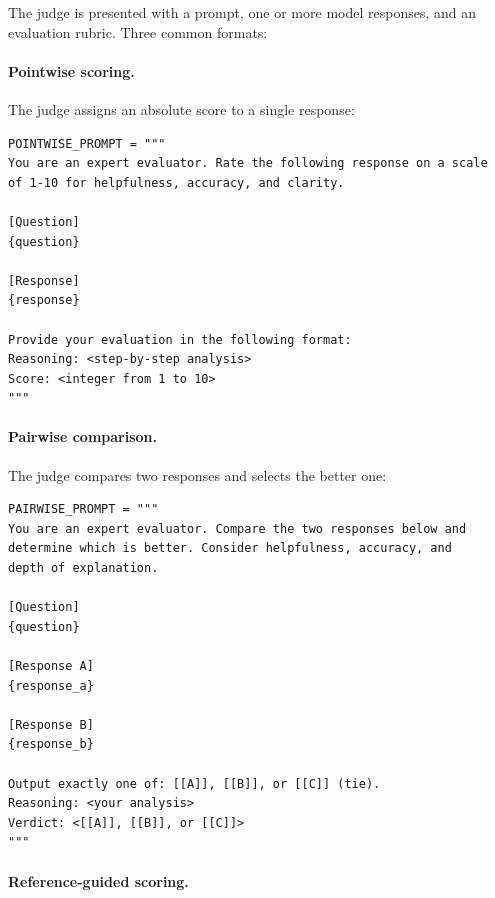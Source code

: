 The judge is presented with a prompt, one or more model responses, and an evaluation rubric. Three common formats:

\paragraph{Pointwise scoring.}
\label{pointwise-scoring.}

The judge assigns an absolute score to a single response:

\begin{examplebox}
\begin{lstlisting}[style=pythonstyle]
POINTWISE_PROMPT = """
You are an expert evaluator. Rate the following response on a scale 
of 1-10 for helpfulness, accuracy, and clarity.

[Question]
{question}

[Response]
{response}

Provide your evaluation in the following format:
Reasoning: <step-by-step analysis>
Score: <integer from 1 to 10>
"""
\end{lstlisting}
\end{examplebox}

\paragraph{Pairwise comparison.}
\label{pairwise-comparison.}

The judge compares two responses and selects the better one:

\begin{examplebox}
\begin{lstlisting}[style=pythonstyle]
PAIRWISE_PROMPT = """
You are an expert evaluator. Compare the two responses below and 
determine which is better. Consider helpfulness, accuracy, and 
depth of explanation.

[Question]
{question}

[Response A]
{response_a}

[Response B]
{response_b}

Output exactly one of: [[A]], [[B]], or [[C]] (tie).
Reasoning: <your analysis>
Verdict: <[[A]], [[B]], or [[C]]>
"""
\end{lstlisting}
\end{examplebox}

\paragraph{Reference-guided scoring.}
\label{reference-guided-scoring.}

